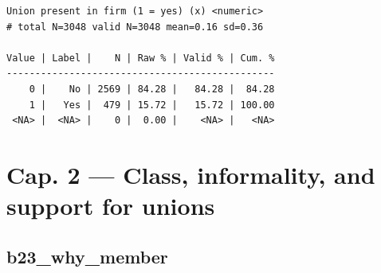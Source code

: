 \documentclass[
  letterpaper,
  DIV=11,
  numbers=noendperiod]{scrreprt}
\newenvironment{Shaded}{\begin{snugshade}}{\end{snugshade}}
\newcommand{\AttributeTok}[1]{\textcolor[rgb]{0.40,0.45,0.13}{#1}}
\newcommand{\DecValTok}[1]{\textcolor[rgb]{0.68,0.00,0.00}{#1}}
\newcommand{\FunctionTok}[1]{\textcolor[rgb]{0.28,0.35,0.67}{#1}}
\newcommand{\NormalTok}[1]{\textcolor[rgb]{0.00,0.23,0.31}{#1}}
\newcommand{\OtherTok}[1]{\textcolor[rgb]{0.00,0.23,0.31}{#1}}
\newcommand{\SpecialCharTok}[1]{\textcolor[rgb]{0.37,0.37,0.37}{#1}}
\newcommand{\StringTok}[1]{\textcolor[rgb]{0.13,0.47,0.30}{#1}}
\begin{document}
\begin{Shaded}
\end{Shaded}

\begin{verbatim}
Union present in firm (1 = yes) (x) <numeric> 
# total N=3048 valid N=3048 mean=0.16 sd=0.36

Value | Label |    N | Raw % | Valid % | Cum. %
-----------------------------------------------
    0 |    No | 2569 | 84.28 |   84.28 |  84.28
    1 |   Yes |  479 | 15.72 |   15.72 | 100.00
 <NA> |  <NA> |    0 |  0.00 |    <NA> |   <NA>
\end{verbatim}

\section{Cap. 2 --- Class, informality, and support for
unions}\label{cap.-2-class-informality-and-support-for-unions}

\subsection{b23\_why\_member}\label{b23_why_member}
\end{document}
